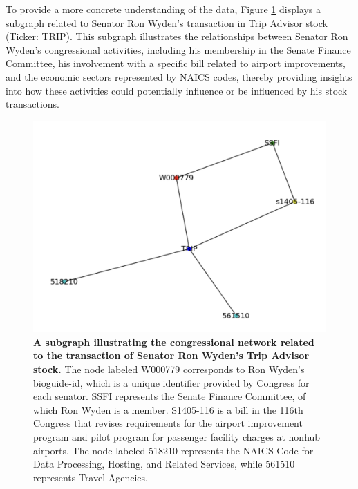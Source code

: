 \documentclass[15pt,letterpaper]{article}
\begin{document}
To provide a more concrete understanding of the data, Figure \ref{fig:trip} displays a subgraph related to Senator Ron Wyden's transaction in Trip Advisor stock (Ticker: TRIP). 
This subgraph illustrates the relationships between Senator Ron Wyden's congressional activities, including his membership in the Senate Finance Committee, his involvement with a specific bill related to airport improvements, and the economic sectors represented by NAICS codes, thereby providing insights into how these activities could potentially influence or be influenced by his stock transactions.

\begin{figure}[h]
  \centering
  \includegraphics[width=1\textwidth]{imgs/trip.png}
  \caption{\textbf{A subgraph illustrating the congressional network related to the transaction of Senator Ron Wyden's Trip Advisor stock.} The node labeled W000779 corresponds to Ron Wyden's bioguide-id, which is a unique identifier provided by Congress for each senator. SSFI represents the Senate Finance Committee, of which Ron Wyden is a member. S1405-116 is a bill in the 116th Congress that revises requirements for the airport improvement program and pilot program for passenger facility charges at nonhub airports. The node labeled 518210 represents the NAICS Code for Data Processing, Hosting, and Related Services, while 561510 represents Travel Agencies.}
  \label{fig:trip}
\end{figure}

\end{document}
